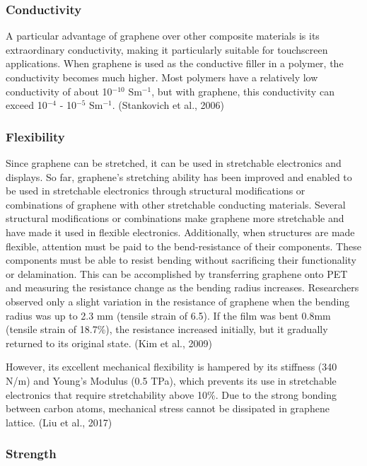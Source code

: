 \documentclass[a4paper,12pt]{article}
\numberwithin{equation}{section}
\numberwithin{figure}{section}
\begin{document}
\subsubsection{Conductivity} 

\noindent A particular advantage of graphene over other composite materials is its extraordinary conductivity, making it particularly suitable for touchscreen applications. When graphene is used as the conductive filler in a polymer, the conductivity becomes much higher. Most polymers have a relatively low conductivity of about 10$^{-10}$ Sm$^{-1}$, but with graphene, this conductivity can exceed 10$^{-4}$ - 10$^{-5}$ Sm$^{-1}$. (Stankovich et al., 2006)

\subsubsection{Flexibility}

\noindent Since graphene can be stretched, it can be used in stretchable electronics and displays. So far, graphene’s stretching ability has been improved and enabled to be used in stretchable electronics through structural modifications or combinations of graphene with other stretchable conducting materials. Several structural modifications or combinations make graphene more stretchable and have made it used in flexible electronics. Additionally, when structures are made flexible, attention must be paid to the bend-resistance of their components. These components must be able to resist bending without sacrificing their functionality or delamination. This can be accomplished by transferring graphene onto PET and measuring the resistance change as the bending radius increases. Researchers observed only a slight variation in the resistance of graphene when the bending radius was up to 2.3 mm (tensile strain of 6.5). If the film was bent 0.8mm (tensile strain of 18.7\%), the resistance increased initially, but it gradually returned to its original state. (Kim et al., 2009)\vspace{\baselineskip}

\noindent However, its excellent mechanical flexibility is hampered by its stiffness (340 N/m) and Young’s Modulus (0.5 TPa), which prevents its use in stretchable electronics that require stretchability above 10\%. Due to the strong bonding between carbon atoms, mechanical stress cannot be dissipated in graphene lattice. (Liu et al., 2017)

\subsubsection{Strength}
\end{document}
